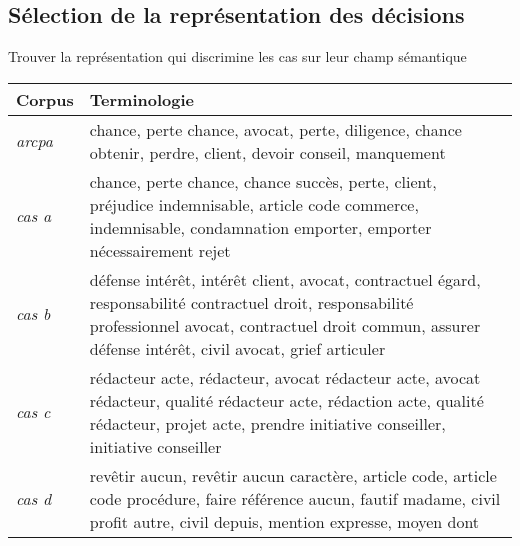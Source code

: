 \subsection{Sélection de la représentation des décisions}
\begin{frame}[t]{\mysubsectiontitle}
	Trouver la représentation qui discrimine les cas sur leur champ sémantique
	
	\begin{table}[ht]
		\scriptsize
		\begin{center}
			\begin{tabular}{|l|p{}|}
				\hline
				\textbf{Corpus} & \textbf{Terminologie} \\ \hline
				\textit{arcpa} & chance, perte chance, avocat, perte, diligence, chance obtenir, perdre, client, devoir conseil, manquement
				\\ \hline
				\textit{cas a} & chance, perte chance, chance succès, perte, client, préjudice indemnisable, article code commerce, indemnisable, condamnation emporter, emporter nécessairement rejet
				\\ \hline
				\textit{cas b} & défense intérêt, intérêt client, avocat, contractuel égard, responsabilité contractuel droit, responsabilité professionnel avocat, contractuel droit commun, assurer défense intérêt, civil avocat, grief articuler
				\\ \hline
				\textit{cas c} & rédacteur acte, rédacteur, avocat rédacteur acte, avocat rédacteur, qualité rédacteur acte, rédaction acte, qualité rédacteur, projet acte, prendre initiative conseiller, initiative conseiller
				\\ \hline
				\textit{cas d} & revêtir aucun, revêtir aucun caractère, article code, article code procédure, faire référence aucun, fautif madame, civil profit autre, civil depuis, mention expresse, moyen dont
				\\ \hline
			\end{tabular}
		\end{center}
	\end{table}
\end{frame}

